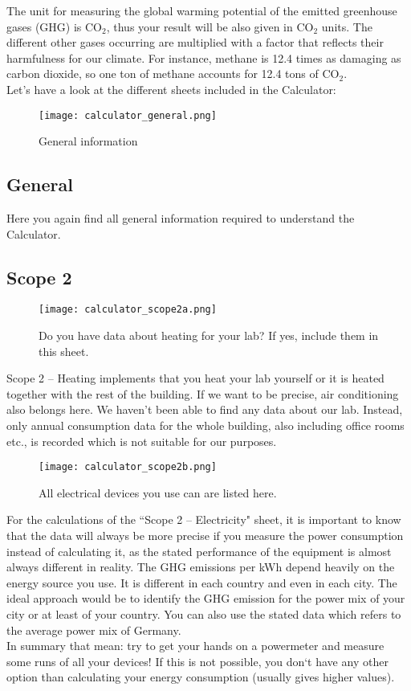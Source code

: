 The unit for measuring the global warming potential of the emitted greenhouse gases (GHG) is CO$_2$, thus your result will be also given in CO$_2$ units. The different other gases occurring are multiplied with a factor that reflects their harmfulness for our climate. For instance, methane is 12.4 times as damaging as carbon dioxide, so one ton of methane accounts for 12.4 tons of CO$_2$. \\
Let’s have a look at the different sheets included in the Calculator:

\begin{wrapfigure}{r}{8cm}
	\centering
	\texttt{[image: calculator\_general.png]}%
	\caption{General information}%
\end{wrapfigure}

\subsection{General}

Here you again find all general information required to understand the Calculator. 

\subsection{Scope 2}
\begin{wrapfigure}{r}{8cm}
	\centering
	\texttt{[image: calculator\_scope2a.png]}%
	\caption{Do you have data about heating for your lab? If yes, include them in this sheet.}%
\end{wrapfigure}

Scope 2 – Heating implements that you heat your lab yourself or it is heated together with the rest of the building. If we want to be precise, air conditioning also belongs here. We haven’t been able to find any data about our lab. Instead, only annual consumption data for the whole building, also including office rooms etc., is recorded which is not suitable for our purposes.
\begin{wrapfigure}{r}{8cm}
	\centering
	\texttt{[image: calculator\_scope2b.png]}%
	\caption{All electrical devices you use can are listed here.}%
\end{wrapfigure}


For the calculations of the “Scope 2 – Electricity" sheet, it is important to know that the data will always be more precise if you measure the power consumption instead of calculating it, as the stated performance of the equipment is almost always different in reality. The GHG emissions per kWh depend heavily on the energy source you use. It is different in each country and even in each city. The ideal approach would be to identify the GHG emission for the power mix of your city or at least of your country. You can also use the stated data which refers to the average power mix of Germany.\\
In summary that mean: try to get your hands on a powermeter and measure some runs of all your devices! If this is not possible, you don`t have any other option than calculating your energy consumption (usually gives higher values). 

